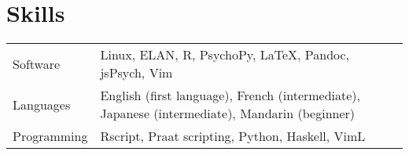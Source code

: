 \documentclass[letterpaper]{article}
\begin{document}
\section*{Skills}
\begin{longtable}{p{}p{}}
    Software &Linux, ELAN, R, PsychoPy, \LaTeX{}, Pandoc, jsPsych, Vim \\
    Languages &English (first language), French (intermediate), Japanese (intermediate),
    Mandarin (beginner)
    \\
    Programming & Rscript, Praat scripting, Python, Haskell, VimL \\
\end{longtable}

\vfill


\end{document}
